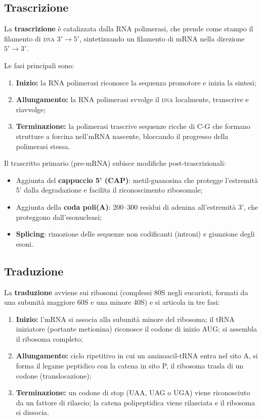 \documentclass[11pt,a4paper,openright,twoside]{book}
\theoremstyle{definition}
\theoremstyle{plain}
\theoremstyle{remark}
\newcommand{\dna}{\textsc{dna}}
\begin{document}
\subsection{Trascrizione}

La \textbf{trascrizione} è catalizzata dalla RNA polimerasi, che prende come stampo il filamento di \dna{} $3'\!\to\!5'$, sintetizzando un filamento di mRNA nella direzione $5'\!\to\!3'$.

Le fasi principali sono:
\begin{enumerate}
  \item \textbf{Inizio:} la RNA polimerasi riconosce la sequenza promotore e inizia la sintesi;
  \item \textbf{Allungamento:} la RNA polimerasi svvolge il \dna{} localmente, transcrive e riavvolge;
  \item \textbf{Terminazione:} la polimerasi trascrive sequenze ricche di C-G che formano strutture a forcina nell'mRNA nascente, bloccando il progresso della polimerasi stessa.
\end{enumerate}

Il trascritto primario (pre-mRNA) subisce modifiche post-trascrizionali:
\begin{itemize}
  \item Aggiunta del \textbf{cappuccio 5' (CAP)}: metil-guanosina che protegge l'estremità 5' dalla degradazione e facilita il riconoscimento ribosomale;
  \item Aggiunta della \textbf{coda poli(A)}: 200--300 residui di adenina all'estremità 3', che proteggono dall'esonucleasi;
  \item \textbf{Splicing}: rimozione delle sequenze non codificanti (introni) e giunzione degli esoni.
\end{itemize}

\subsection{Traduzione}

La \textbf{traduzione} avviene sui ribosomi (complessi 80S negli eucarioti, formati da una subunità maggiore 60S e una minore 40S) e si articola in tre fasi:

\begin{enumerate}
  \item \textbf{Inizio:} l'mRNA si associa alla subunità minore del ribosoma; il tRNA iniziatore (portante metionina) riconosce il codone di inizio AUG; si assembla il ribosoma completo;
  \item \textbf{Allungamento:} ciclo ripetitivo in cui un aminoacil-tRNA entra nel sito A, si forma il legame peptidico con la catena in sito P, il ribosoma trasla di un codone (translocazione);
  \item \textbf{Terminazione:} un codone di stop (UAA, UAG o UGA) viene riconosciuto da un fattore di rilascio; la catena polipeptidica viene rilasciata e il ribosoma si dissocia.
\end{enumerate}
\end{document}
